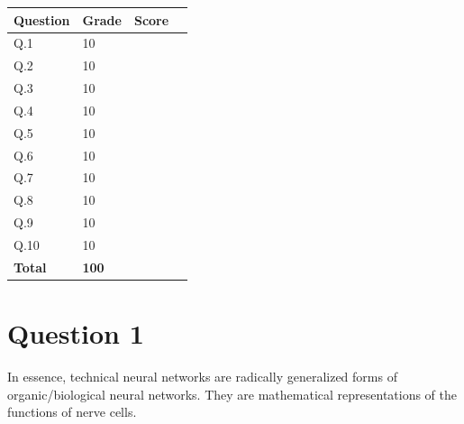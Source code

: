 \documentclass[10pt,a4paper]{article}
\begin{document}
\begin{center}
\begin{tabular}{|M{2cm}|M{2cm}|M{2cm}|N}
 	\hline
    \textbf{Question} & \textbf{Grade} & \textbf{Score} &\\[10pt] \hline
    Q.1 & 10 &  &\\ [7pt] \hline
 	Q.2 & 10 &  &\\ [7pt] \hline
 	Q.3 & 10 &  &\\ [7pt] \hline
 	Q.4 & 10 &  &\\ [7pt] \hline
 	Q.5 & 10 &  &\\ [7pt] \hline
 	Q.6 & 10 &  &\\ [7pt] \hline
 	Q.7 & 10 &  &\\ [7pt] \hline
 	Q.8 & 10 &  &\\ [7pt] \hline
    Q.9 & 10 &  &\\ [7pt] \hline
 	Q.10 & 10 &  &\\ [7pt] \hline
    \textbf{Total} & \textbf{100} &  &\\[10pt] \hline
    
\end{tabular}

\end{center}
\newpage
\section*{Question 1}

In essence, technical neural networks are radically generalized forms of organic/biological neural networks. They are mathematical representations of the functions of nerve cells. \\


 \\
\end{document}
